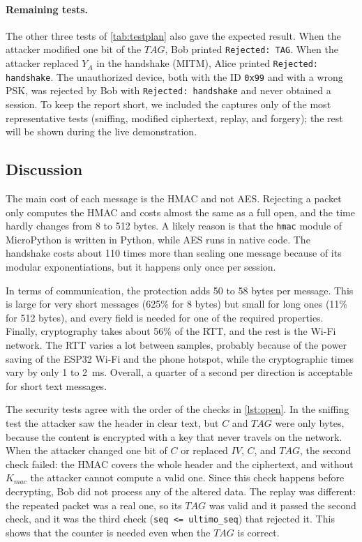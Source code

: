 \documentclass[11pt,a4paper]{article}
\begin{document}
\paragraph{Remaining tests.} The other three tests of \cref{tab:testplan} also
gave the expected result. When the attacker modified one bit of the
$\mathit{TAG}$, Bob printed \texttt{Rejected: TAG}. When the attacker replaced
$Y_A$ in the handshake (MITM), Alice printed \texttt{Rejected: handshake}. The
unauthorized device, both with the ID \texttt{0x99} and with a wrong PSK, was
rejected by Bob with \texttt{Rejected: handshake} and never obtained a session.
To keep the report short, we included the captures only of the most
representative tests (sniffing, modified ciphertext, replay, and forgery); the
rest will be shown during the live demonstration.

\subsection{Discussion}

The main cost of each message is the HMAC and not AES. Rejecting a packet only
computes the HMAC and costs almost the same as a full open, and the time hardly
changes from 8 to 512 bytes. A likely reason is that the \texttt{hmac} module
of MicroPython is written in Python, while AES runs in native code. The
handshake costs about 110 times more than sealing one message because of its
modular exponentiations, but it happens only once per session.

In terms of communication, the protection adds 50 to 58 bytes per message. This
is large for very short messages (625\% for 8 bytes) but small for long ones
(11\% for 512 bytes), and every field is needed for one of the required
properties. Finally, cryptography takes about 56\% of the RTT, and the rest is
the Wi-Fi network. The RTT varies a lot between samples, probably because of the
power saving of the ESP32 Wi-Fi and the phone hotspot, while the cryptographic
times vary by only 1 to 2~ms. Overall, a quarter of a second per direction is
acceptable for short text messages.

The security tests agree with the order of the checks in \cref{lst:open}. In
the sniffing test the attacker saw the header in clear text, but $C$ and
$\mathit{TAG}$ were only bytes, because the content is encrypted with a key that
never travels on the network. When the attacker changed one bit of $C$ or
replaced $\mathit{IV}$, $C$, and $\mathit{TAG}$, the second check failed: the
HMAC covers the whole header and the ciphertext, and without $K_{mac}$ the
attacker cannot compute a valid one. Since this check happens before decrypting,
Bob did not process any of the altered data. The replay was different: the
repeated packet was a real one, so its $\mathit{TAG}$ was valid and it passed
the second check, and it was the third check (\texttt{seq <= ultimo\_seq}) that
rejected it. This shows that the counter is needed even when the $\mathit{TAG}$
is correct.
\end{document}
